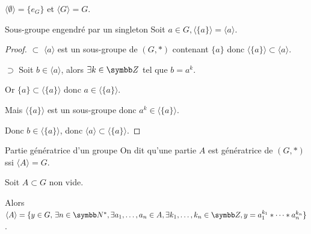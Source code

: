 \begin{exemple}
    $\langle \emptyset \rangle = \{e_G\}$ et $\langle G \rangle = G$.
\end{exemple}

\begin{proposition}{Sous-groupe engendré par un singleton}{}
    Soit $a \in G, \langle \{a\} \rangle = \langle a \rangle$.
\end{proposition}

\begin{proof}
    $\subset$ $\langle a \rangle$ est un sous-groupe de $(G, \ast)$ contenant $\{a\}$ donc $\langle \{a\} \rangle \subset \langle a \rangle$.

    $\supset$ Soit $b \in \langle a \rangle$, alors $\exists k \in \Z$ tel que $b = a^k$.

    Or $\{a\} \subset \langle \{a\} \rangle$ donc $a \in \langle \{a\} \rangle$.

    Mais $\langle \{a\} \rangle$ est un sous-groupe donc $a^k \in \langle \{a\} \rangle$.

    Donc $b \in \langle \{a\} \rangle$, donc $\langle a \rangle \subset \langle \{a\} \rangle$.
\end{proof}

\begin{definition}{Partie génératrice d'un groupe}{}
    On dit qu'une partie $A$ est génératrice de $(G, \ast)$ ssi $\langle A \rangle = G$.
\end{definition}

\begin{theoreme}{}{}
    Soit $A \subset G$ non vide.

    Alors
    $\langle A \rangle = \{y \in G, \, \exists n \in \N^*, \exists a_1, \ldots, a_n \in A, \exists k_1, \ldots, k_n \in \Z, y = a_1^{k_1} \ast \cdots \ast a_n^{k_n}\}$.
\end{theoreme}


